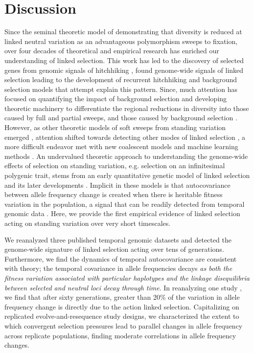 \documentclass[11pt]{article}
\newcommand{\vb}[1]{{\it \color{blue} #1}}
\begin{document}
\section{Discussion}

Since the seminal theoretic model of \textcite{Maynard_Smith1974-lc}
demonstrating that diversity is reduced at linked neutral variation as an
advantageous polymorphism sweeps to fixation, over four decades of theoretical
and empirical research has enriched our understanding of linked selection. This
work has led to the discovery of selected genes from genomic signals of
hitchhiking \parencite{Nair2003-tw,Voight2006-rn}, found genome-wide signals of
linked selection
\parencite{Aguade1989-jx,Begun1992-ey,Cutter2010-gi,Andersen2012-bj,Cutter2003-tl}
leading to the development of recurrent hitchhiking \parencite{Stephan1992-jc}
and background selection \parencite{Charlesworth1993-gb} models that attempt
explain this pattern. Since, much attention has focused on quantifying the
impact of background selection \parencite{McVicker2009-ax} and developing
theoretic machinery \parencite{Coop2012-cd} to differentiate the regional
reductions in diversity into those caused by full and partial sweeps, and those
caused by background selection \parencite{Elyashiv2016-vt}. However, as other
theoretic models of soft sweeps from standing variation emerged
\parencite{Hermisson2005-hs,Pennings2006-lj}, attention shifted towards
detecting other modes of linked selection \parencite{Pritchard2010-tk}, a more
difficult endeavor \parencite{Przeworski2005-bg} met with new coalescent models
\parencite{Berg2015-xj} and machine learning methods
\parencite{Schrider2017-yx}. An undervalued theoretic approach to understanding
the genome-wide effects of selection on standing variation, e.g. selection on
an infinitesimal polygenic trait, stems from an early quantitative genetic
model of linked selection \parencite{Robertson1961-ho} and its later
developments \parencite{Santiago1995-hx,Santiago1998-bs}. Implicit in these
models is that autocovariance between allele frequency change is created when
there is heritable fitness variation in the population, a signal that can be
readily detected from temporal genomic data \parencite{Buffalo2019-io}. Here,
we provide the first empirical evidence of linked selection acting on standing
variation over very short timescales.

We reanalyzed three published temporal genomic datasets and detected the
genome-wide signature of linked selection acting over tens of generations.
Furthermore, we find the dynamics of temporal autocovariance are consistent
with theory; the temporal covariance in allele frequencies decays \vb{as both
the fitness variation associated with particular haplotypes and the linkage
disequilibria between selected and neutral loci decay through time}. In
reanalyzing one study \parencite{Barghi2019-qy}, we find that after sixty
generations, greater than 20\% of the variation in allele frequency change is
directly due to the action linked selection. Capitalizing on replicated
evolve-and-resequence study designs, we characterized the extent to which
convergent selection pressures lead to parallel changes in allele frequency
across replicate populations, finding moderate correlations in allele frequency
changes.
\end{document}
